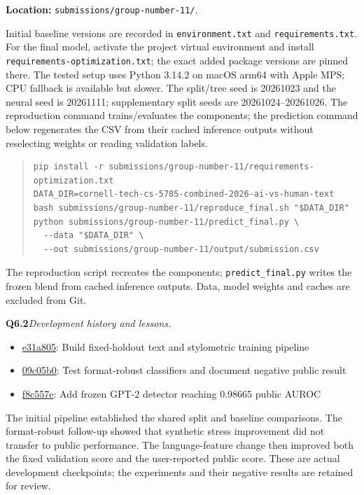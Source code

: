 \documentclass[10pt,letterpaper]{article}
\newcommand{\q}[2]{\needspace{4\baselineskip}\par\addvspace{7pt}\textbf{#1}\quad\textit{#2}\par\nobreak}
\begin{document}
\textbf{Location:} \texttt{submissions/group-number-11/}.\par
Initial baseline versions are recorded in \texttt{environment.txt} and \texttt{requirements.txt}.
For the final model, activate the project virtual environment and install \texttt{requirements-optimization.txt}; the exact added package versions are pinned there.
The tested setup uses Python 3.14.2 on macOS arm64 with Apple MPS; CPU fallback is available but slower.
The split/tree seed is 20261023 and the neural seed is 20261111; supplementary split seeds are 20261024--20261026.
The reproduction command trains/evaluates the components; the prediction command below regenerates the CSV from their cached inference outputs without reselecting weights or reading validation labels.
\begin{quote}\footnotesize\begin{verbatim}
pip install -r submissions/group-number-11/requirements-optimization.txt
DATA_DIR=cornell-tech-cs-5785-combined-2026-ai-vs-human-text
bash submissions/group-number-11/reproduce_final.sh "$DATA_DIR"
python submissions/group-number-11/predict_final.py \
  --data "$DATA_DIR" \
  --out submissions/group-number-11/output/submission.csv
\end{verbatim}\end{quote}
The reproduction script recreates the components; \texttt{predict\_final.py} writes the frozen blend from cached inference outputs. Data, model weights and caches are excluded from Git.
\q{Q6.2}{Development history and lessons.}\begin{itemize}[leftmargin=1.5em,itemsep=3pt]
\item \href{https://github.com/hisylvia66/human-or-ai-submissions/commit/e31a805}{e31a805}: Build fixed-holdout text and stylometric training pipeline
\item \href{https://github.com/hisylvia66/human-or-ai-submissions/commit/09c05b0}{09c05b0}: Test format-robust classifiers and document negative public result
\item \href{https://github.com/hisylvia66/human-or-ai-submissions/commit/f8c557e}{f8c557e}: Add frozen GPT-2 detector reaching 0.98665 public AUROC
\end{itemize}The initial pipeline established the shared split and baseline comparisons. The format-robust follow-up showed that synthetic stress improvement did not transfer to public performance. The language-feature change then improved both the fixed validation score and the user-reported public score. These are actual development checkpoints; the experiments and their negative results are retained for review.
\end{document}
